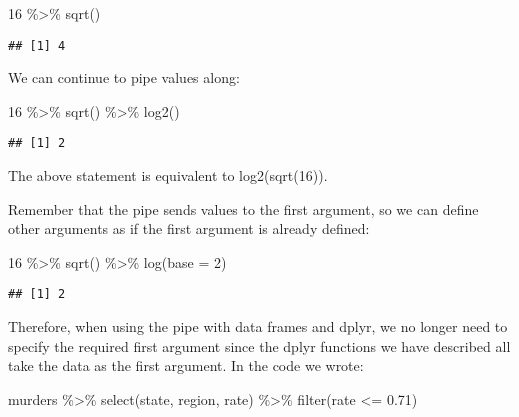 \documentclass[
]{article}
\newenvironment{Shaded}{\begin{snugshade}}{\end{snugshade}}
\newcommand{\AttributeTok}[1]{\textcolor[rgb]{0.77,0.63,0.00}{#1}}
\newcommand{\DecValTok}[1]{\textcolor[rgb]{0.00,0.00,0.81}{#1}}
\newcommand{\FloatTok}[1]{\textcolor[rgb]{0.00,0.00,0.81}{#1}}
\newcommand{\FunctionTok}[1]{\textcolor[rgb]{0.00,0.00,0.00}{#1}}
\newcommand{\NormalTok}[1]{#1}
\newcommand{\SpecialCharTok}[1]{\textcolor[rgb]{0.00,0.00,0.00}{#1}}
\begin{document}
\begin{Shaded}
\begin{Highlighting}[]
\DecValTok{16} \SpecialCharTok{\%\textgreater{}\%} \FunctionTok{sqrt}\NormalTok{()}
\end{Highlighting}
\end{Shaded}

\begin{verbatim}
## [1] 4
\end{verbatim}

We can continue to pipe values along:

\begin{Shaded}
\begin{Highlighting}[]
\DecValTok{16} \SpecialCharTok{\%\textgreater{}\%} \FunctionTok{sqrt}\NormalTok{() }\SpecialCharTok{\%\textgreater{}\%} \FunctionTok{log2}\NormalTok{()}
\end{Highlighting}
\end{Shaded}

\begin{verbatim}
## [1] 2
\end{verbatim}

The above statement is equivalent to log2(sqrt(16)).

Remember that the pipe sends values to the first argument, so we can
define other arguments as if the first argument is already defined:

\begin{Shaded}
\begin{Highlighting}[]
\DecValTok{16} \SpecialCharTok{\%\textgreater{}\%} \FunctionTok{sqrt}\NormalTok{() }\SpecialCharTok{\%\textgreater{}\%} \FunctionTok{log}\NormalTok{(}\AttributeTok{base =} \DecValTok{2}\NormalTok{)}
\end{Highlighting}
\end{Shaded}

\begin{verbatim}
## [1] 2
\end{verbatim}

Therefore, when using the pipe with data frames and dplyr, we no longer
need to specify the required first argument since the dplyr functions we
have described all take the data as the first argument. In the code we
wrote:

\begin{Shaded}
\begin{Highlighting}[]
\NormalTok{murders }\SpecialCharTok{\%\textgreater{}\%} \FunctionTok{select}\NormalTok{(state, region, rate) }\SpecialCharTok{\%\textgreater{}\%} \FunctionTok{filter}\NormalTok{(rate }\SpecialCharTok{\textless{}=} \FloatTok{0.71}\NormalTok{)}
\end{Highlighting}
\end{Shaded}
\end{document}
